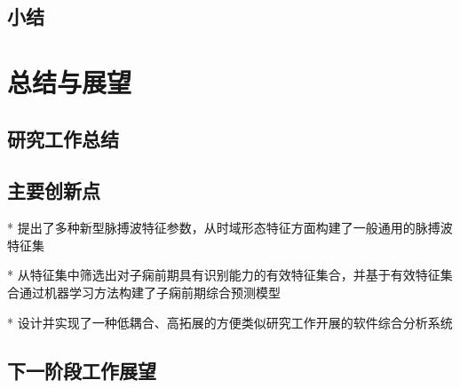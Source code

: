 \section{小结}

\chapter{总结与展望}
\section{研究工作总结}
\section{主要创新点}
* 提出了多种新型脉搏波特征参数，从时域形态特征方面构建了一般通用的脉搏波特征集

* 从特征集中筛选出对子痫前期具有识别能力的有效特征集合，并基于有效特征集合通过机器学习方法构建了子痫前期综合预测模型

* 设计并实现了一种低耦合、高拓展的方便类似研究工作开展的软件综合分析系统

\section{下一阶段工作展望}



